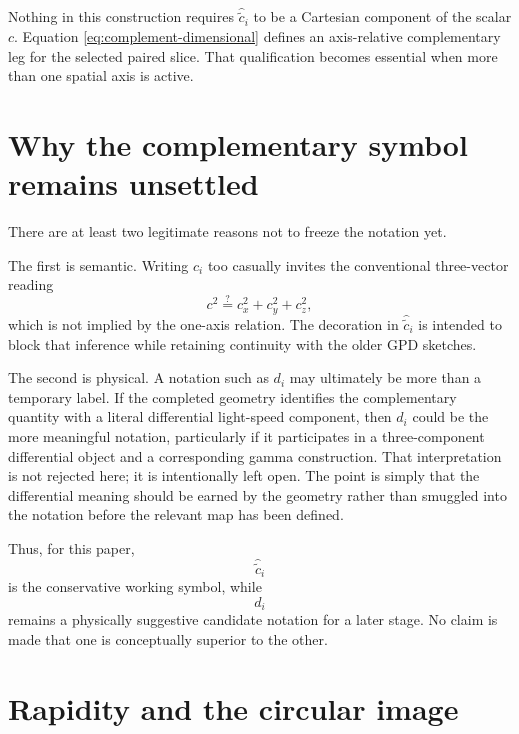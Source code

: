 \documentclass[11pt]{article}
\newcommand{\ccomp}[1]{\widehat{\widetilde{c}}_{#1}}
\begin{document}
Nothing in this construction requires $\ccomp{i}$ to be a Cartesian component
of the scalar $c$. Equation \eqref{eq:complement-dimensional} defines an
axis-relative complementary leg for the selected paired slice. That
qualification becomes essential when more than one spatial axis is active.

\section{Why the complementary symbol remains unsettled}

There are at least two legitimate reasons not to freeze the notation yet.

The first is semantic. Writing $c_i$ too casually invites the conventional
three-vector reading
\begin{equation}
c^2\stackrel{?}{=}c_x^2+c_y^2+c_z^2,
\end{equation}
which is not implied by the one-axis relation. The decoration in
$\ccomp{i}$ is intended to block that inference while retaining continuity
with the older GPD sketches.

The second is physical. A notation such as $d_i$ may ultimately be more than
a temporary label. If the completed geometry identifies the complementary
quantity with a literal differential light-speed component, then $d_i$ could
be the more meaningful notation, particularly if it participates in a
three-component differential object and a corresponding gamma construction.
That interpretation is not rejected here; it is intentionally left open.
The point is simply that the differential meaning should be earned by the
geometry rather than smuggled into the notation before the relevant map has
been defined.

Thus, for this paper,
\begin{equation}
\ccomp{i}
\end{equation}
is the conservative working symbol, while
\begin{equation}
d_i
\end{equation}
remains a physically suggestive candidate notation for a later stage. No
claim is made that one is conceptually superior to the other.

\section{Rapidity and the circular image}
\end{document}
